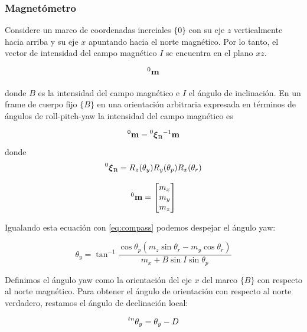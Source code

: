 \begin{frame}
    \frametitle{Magnetómetro}
    \scriptsize
    Considere un marco de coordenadas inerciales $\{ 0 \}$ con su eje $z$ verticalmente hacia arriba y su eje $x$ apuntando hacia el norte magnético. Por lo tanto, el vector de intensidad del campo magnético $I$ se encuentra en el plano $xz$.

    \begin{equation*}
        \toCoord{\vec{m}}{0}
    \end{equation*}

    donde $B$ es la intensidad del campo magnético e $I$ el ángulo de inclinación. En un frame de cuerpo fijo $\{ B \}$ en una orientación arbitraria expresada en términos de ángulos de roll-pitch-yaw la intensidad del campo magnético es

    \begin{equation}
        \label{eq:compass}
        \toCoord{\vec{m}}{0} = \transform{0}{B}^{-1} \vec{m}
    \end{equation}
    donde
    \begin{equation*}
        \transform{0}{B} = R_{z}(\theta_{y}) R_{y}(\theta_{p}) R_{x}(\theta_{r})
    \end{equation*}

    \begin{equation*}
    \toCoord{\vec{m}}{0} =
    \begin{bmatrix}
        m_{x} \\
        m_{y} \\
        m_{z}
    \end{bmatrix}
    \end{equation*}

    Igualando esta ecuación con \ref{eq:compass} podemos despejar el ángulo yaw:

    \begin{equation*}
        \theta_{y} = \tan^{-1} \dfrac{\cos \theta_{p}  \left( m_{z} \sin \theta_{r} - m_{y} \cos \theta_{r} \right)} {m_{x} + B \sin I \sin \theta_{p}}
    \end{equation*}

    Definimos el ángulo yaw como la orientación del eje $x$ del marco $\{ B \}$ con respecto al norte magnético. Para obtener el ángulo de orientación con respecto al norte verdadero, restamos el ángulo de declinación local:

    \begin{equation*}
        \prescript{tn}{}{\theta_{y}} = \theta_{y} - D
    \end{equation*}

\end{frame}
